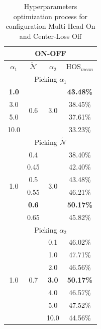 \documentclass[10pt,twocolumn,letterpaper]{article}
\begin{document}
\begin{table}[t!]
  \vspace{-2cm}
  \centering
  \begin{tabular}[h]{||c|c|c||c||}
    \hline
    \multicolumn{4}{||c||}{ON-OFF} \\
    \hline
    $\alpha_1$ & $\mathcal{\tilde N}$ & $\alpha_2$ & HOS$_{mean}$\\    
    \hline
    \hline
    \multicolumn{4}{||c||}{Picking $\alpha_1$} \\
    \hline
    {\bf 1.0}  & \multirow{4}{*}{0.6} & \multirow{4}{*}{3.0} & {\bf 43.48\%} \\
    3.0  & & & 38.45\% \\
    5.0  & & & 37.61\% \\
    10.0 & & & 33.23\% \\
    \hline
    \hline
    \multicolumn{4}{||c||}{Picking $\mathcal{\tilde N}$} \\
    \hline
    \multirow{6}{*}{1.0} & 0.4 & \multirow{6}{*}{3.0}  & 38.40\%\\
    & 0.45 & & 42.40\% \\
    & 0.5 & & 43.48\% \\
    & 0.55 & & 46.21\% \\
    & {\bf0.6} & & {\bf 50.17\%} \\
    & 0.65 & & 45.82\% \\
    \hline
    \hline
    \multicolumn{4}{||c||}{Picking $\alpha_2$} \\
    \hline
    \multirow{7}{*}{1.0} & \multirow{7}{*}{0.7} & 0.1 & 46.02\%\\
    && 1.0 & 47.71\% \\
    && 2.0 & 46.56\% \\
    && {\bf 3.0} & {\bf 50.17\%} \\
    && 4.0 & 46.57\% \\
    && 5.0 & 47.52\% \\
    && 10.0 & 44.56\% \\
    \hline
  \end{tabular}
  \caption{\centering\label{tab:ablationonoff} Hyperparameters optimization process for configuration Multi-Head On and Center-Loss Off}
\end{table}
\end{document}
